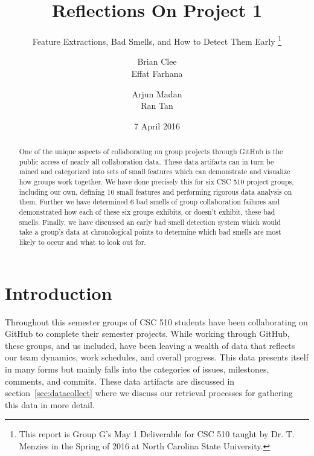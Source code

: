 \documentclass{acm_proc_article-sp}
\begin{document}
\title{Reflections On Project 1}
\subtitle{Feature Extractions, Bad Smells, and How to Detect Them Early \thanks{This report is Group G's May 1 Deliverable for CSC 510 taught by Dr. T. Menzies in the Spring of 2016 at North Carolina State University.}}

\author{
\alignauthor
Brian Clee\\
\alignauthor
Effat Farhana\\
\and %
\alignauthor
Arjun Madan\\
\alignauthor
Ran Tan\\
}

\date{7 April 2016}
\maketitle

\begin{abstract}
One of the unique aspects of collaborating on group projects through GitHub is the public access of nearly all collaboration data. These data artifacts can in turn be mined and categorized into sets of small features which can demonstrate and visualize how groups work together. We have done precisely this for six CSC 510 project groups, including our own, defining 10 small features and performing rigorous data analysis on them. Further we have determined 6 bad smells of group collaboration failures and demonstrated how each of these six groups exhibits, or doesn't exhibit, these bad smells. Finally, we have discussed an early bad smell detection system which would take a group's data at chronological points to determine which bad smells are most likely to occur and what to look out for.

\end{abstract}

\section{Introduction}\label{sec:intro}

Throughout this semester groups of CSC 510 students have been collaborating on GitHub to complete their semester projects. While working through GitHub, these groups, and us included, have been leaving a wealth of data that reflects our team dynamics, work schedules, and overall progress. This data presents itself in many forms but mainly falls into the categories of issues, milestones, comments, and commits. These data artifacts are discussed in section~\ref{sec:datacollect} where we discuss our retrieval processes for gathering this data in more detail.
\end{document}
